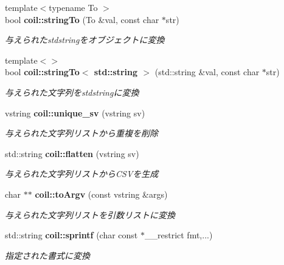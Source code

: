 \begin{DoxyCompactItemize}
{\footnotesize template$<$typename To $>$ }\\bool {\bf coil::stringTo} (To \&val, const char $\ast$str)
\begin{DoxyCompactList}\small\item\em 与えられたstdstringをオブジェクトに変換 \item\end{DoxyCompactList}\item 
{\footnotesize template$<$$>$ }\\bool {\bf coil::stringTo$<$ std::string $>$} (std::string \&val, const char $\ast$str)
\begin{DoxyCompactList}\small\item\em 与えられた文字列をstdstringに変換 \item\end{DoxyCompactList}\item 
vstring {\bf coil::unique\_\-sv} (vstring sv)
\begin{DoxyCompactList}\small\item\em 与えられた文字列リストから重複を削除 \item\end{DoxyCompactList}\item 
std::string {\bf coil::flatten} (vstring sv)
\begin{DoxyCompactList}\small\item\em 与えられた文字列リストからCSVを生成 \item\end{DoxyCompactList}\item 
char $\ast$$\ast$ {\bf coil::toArgv} (const vstring \&args)
\begin{DoxyCompactList}\small\item\em 与えられた文字列リストを引数リストに変換 \item\end{DoxyCompactList}\item 
std::string {\bf coil::sprintf} (char const $\ast$\_\-\_\-restrict fmt,...)
\begin{DoxyCompactList}\small\item\em 指定された書式に変換 \item\end{DoxyCompactList}\end{DoxyCompactItemize}
